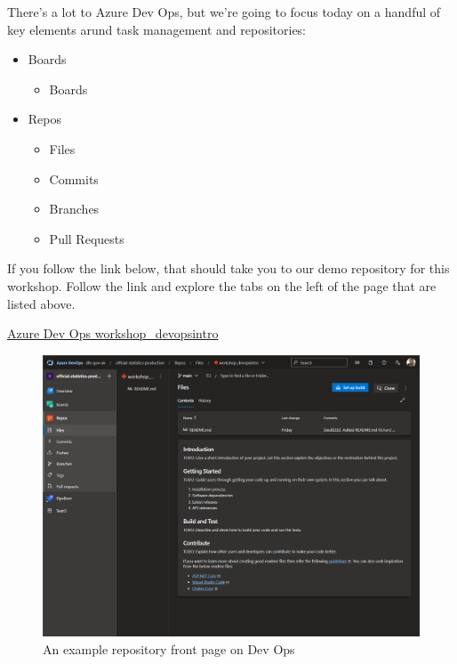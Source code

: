 \documentclass[
  12pt,
]{article}
\providecommand{\tightlist}{%
  \setlength{\itemsep}{0pt}\setlength{\parskip}{0pt}}
\begin{document}
There's a lot to Azure Dev Ops, but we're going to focus today on a
handful of key elements arund task management and repositories:

\begin{itemize}
\tightlist
\item
  Boards

  \begin{itemize}
  \tightlist
  \item
    Boards
  \end{itemize}
\item
  Repos

  \begin{itemize}
  \tightlist
  \item
    Files
  \item
    Commits
  \item
    Branches
  \item
    Pull Requests
  \end{itemize}
\end{itemize}

If you follow the link below, that should take you to our demo
repository for this workshop. Follow the link and explore the tabs on
the left of the page that are listed above.

\href{https://dfe-gov-uk.visualstudio.com/official-statistics-production/_git/workshop_devopsintro}{Azure
Dev Ops workshop\_devopsintro}

\begin{figure}
\centering
\includegraphics{images/DevOpsdemo/DevOps_repo_frontpage.PNG}
\caption{An example repository front page on Dev Ops}
\end{figure}
\end{document}
